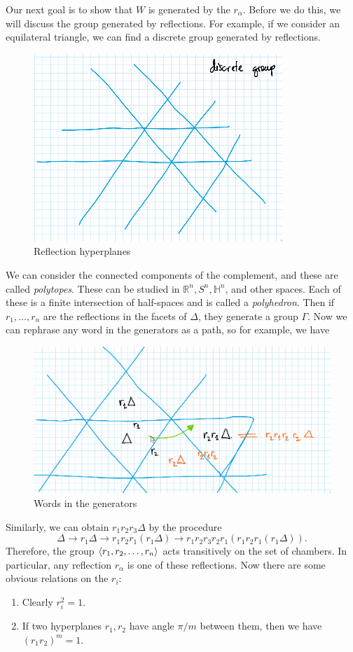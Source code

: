 \documentclass[leqno, openany]{memoir}
\theoremstyle{definition}
\theoremstyle{remark}
\theoremstyle{plain}
\theoremstyle{definition}
\theoremstyle{remark}
\newcommand{\R}{\mathbb{R}}
\begin{document}
Our next goal is to show that $W$ is generated by the $r_{\alpha}$. Before we do this, we will discuss the group generated by reflections. For example, if we consider an equilateral triangle, we can find a discrete group generated by reflections.
\begin{figure}[H]
    \centering
    \includegraphics[scale=0.6]{reflection.png}
    \caption{Reflection hyperplanes}%
    \label{fig:reflection}
\end{figure}
We can consider the connected components of the complement, and these are called \textit{polytopes}. These can be studied in $\R^n, S^n, \mathbb{H}^n$, and other spaces. Each of these is a finite intersection of half-spaces and is called a \textit{polyhedron}. Then if $r_1, \ldots, r_n$ are the reflections in the facets of $\Delta$, they generate a group $\Gamma$. Now we can rephrase any word in the generators as a path, so for example, we have
\begin{figure}[H]
    \centering
    \includegraphics[width=0.8\linewidth]{reflwords}
    \caption{Words in the generators}%
    \label{fig:reflwords}
\end{figure}
Similarly, we can obtain $r_1 r_2 r_3 \Delta$ by the procedure
\[ \Delta \to r_1 \Delta \to r_1 r_2 r_1 (r_1 \Delta) \to r_1 r_2 r_3 r_2 r_1 (r_1 r_2 r_1 (r_1 \Delta)). \]
Therefore, the group $\ev{r_1, r_2, \ldots, r_n}$ acts transitively on the set of chambers. In particular, any reflection $r_{\alpha}$ is one of these reflections. Now there are some obvious relations on the $r_i$:
\begin{enumerate}
    \item Clearly $r_i^2 = 1$.
    \item If two hyperplanes $r_1, r_2$ have angle $\pi/m$ between them, then we have ${(r_1 r_2)}^m = 1$. 
\end{enumerate}
\end{document}
